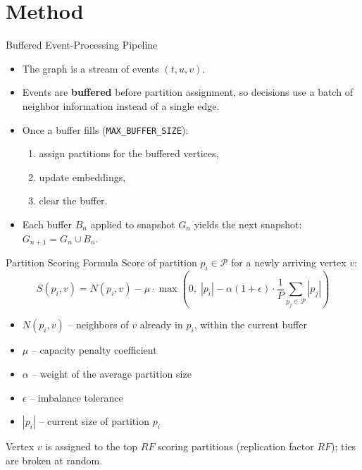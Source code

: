 \documentclass[aspectratio=169]{beamer}
\begin{document}
\section{Method}

\begin{frame}{Buffered Event-Processing Pipeline}
  \begin{itemize}
    \item The graph is a stream of events $(t, u, v)$.
    \item Events are \textbf{buffered} before partition assignment, so decisions use a batch of neighbor information instead of a single edge.
    \item Once a buffer fills (\texttt{MAX\_BUFFER\_SIZE}):
    \begin{enumerate}
      \item assign partitions for the buffered vertices,
      \item update embeddings,
      \item clear the buffer.
    \end{enumerate}
    \item Each buffer $B_n$ applied to snapshot $G_n$ yields the next snapshot: $G_{n+1} = G_n \cup B_n$.
  \end{itemize}
\end{frame}

\begin{frame}{Partition Scoring Formula}
  Score of partition $p_i \in \mathcal{P}$ for a newly arriving vertex $v$:
  \[
    S(p_i, v) = N(p_i, v) - \mu \cdot \max\!\left(0,\; |p_i| - \alpha (1+\epsilon) \cdot \frac{1}{P}\sum_{p_j \in \mathcal{P}} |p_j|\right)
  \]
  \begin{itemize}
    \item $N(p_i, v)$ -- neighbors of $v$ already in $p_i$, within the current buffer
    \item $\mu$ -- capacity penalty coefficient
    \item $\alpha$ -- weight of the average partition size
    \item $\epsilon$ -- imbalance tolerance
    \item $|p_i|$ -- current size of partition $p_i$
  \end{itemize}
  Vertex $v$ is assigned to the top $RF$ scoring partitions (replication factor $RF$); ties are broken at random.
\end{frame}

\end{document}
